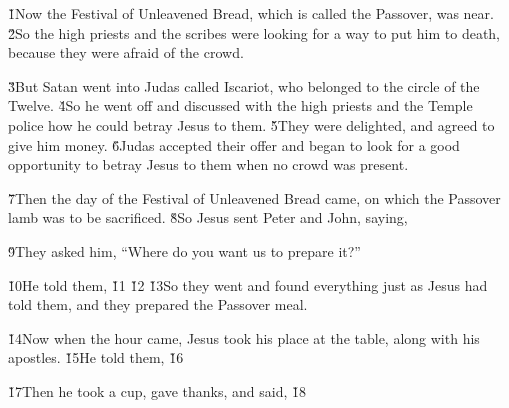 \v{1}Now the Festival of Unleavened Bread, which is called the Passover, was near. \v{2}So the high priests and the scribes were looking for a way to put him to death, because they were afraid of the crowd.

\v{3}But Satan went into Judas called Iscariot, who belonged to the circle of the Twelve. \v{4}So he went off and discussed with the high priests and the Temple police how he could betray Jesus to them. \v{5}They were delighted, and agreed to give him money. \v{6}Judas accepted their offer and began to look for a good opportunity to betray Jesus to them when no crowd was present.

\v{7}Then the day of the Festival of Unleavened Bread came, on which the Passover lamb was to be sacrificed. \v{8}So Jesus sent Peter and John, saying, 

\v{9}They asked him, ``Where do you want us to prepare it?''

\v{10}He told them,  \v{11} \v{12} \v{13}So they went and found everything just as Jesus had told them, and they prepared the Passover meal.

\v{14}Now when the hour came, Jesus took his place at the table, along with his apostles. \v{15}He told them,  \v{16}

\v{17}Then he took a cup, gave thanks, and said,  \v{18}

